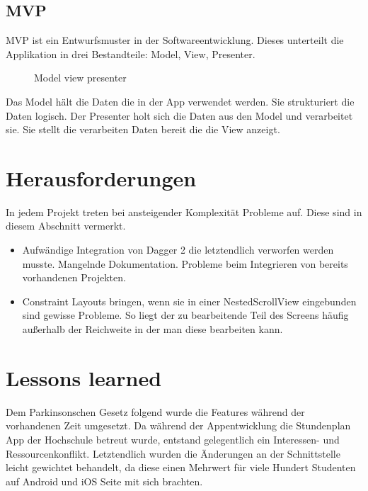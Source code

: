 \documentclass[
    DIV12,
    cleardouble=plain,
    headings=normal,
    pdftex,
    headexclude,footexclude,
    final
]{scrreprt}
\begin{document}
\section{MVP}
MVP ist ein Entwurfsmuster in der Softwareentwicklung.  Dieses unterteilt die Applikation in drei Bestandteile: Model, View, Presenter.\\

\begin{figure}[H]
	\centering
	\caption{Model view presenter}
	\label{MVP}
\end{figure}

Das Model hält die Daten die in der App verwendet werden. Sie strukturiert die Daten logisch. Der Presenter holt sich die Daten aus den Model und verarbeitet sie. Sie stellt die verarbeiten Daten bereit die die View anzeigt.

\newpage

\chapter{Herausforderungen}
In jedem Projekt treten bei ansteigender Komplexität Probleme auf. Diese sind in diesem Abschnitt vermerkt.

\begin{itemize}
\item Aufwändige Integration von Dagger 2 die letztendlich verworfen werden musste. Mangelnde Dokumentation. Probleme beim Integrieren von bereits vorhandenen Projekten.
\item Constraint Layouts bringen, wenn sie in einer NestedScrollView eingebunden sind gewisse Probleme. So liegt der zu bearbeitende Teil des Screens häufig außerhalb der Reichweite in der man diese bearbeiten kann.
\end{itemize}

\newpage

\chapter{Lessons learned}
Dem Parkinsonschen Gesetz folgend wurde die Features während der vorhandenen Zeit umgesetzt. Da während der Appentwicklung die Stundenplan App der Hochschule betreut wurde, entstand gelegentlich ein Interessen- und Ressourcenkonflikt. Letztendlich wurden die Änderungen an der Schnittstelle leicht gewichtet behandelt, da diese einen Mehrwert für viele Hundert Studenten auf Android und iOS Seite mit sich brachten.\\
\end{document}
